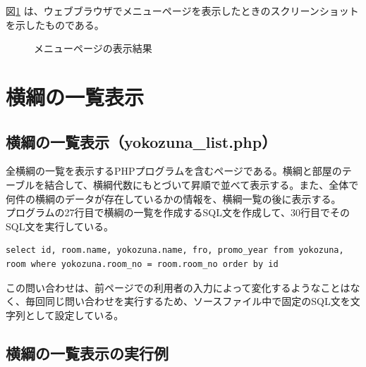\documentclass[10pt,a4paper,titlepage]{jreport}
\begin{document}
図\ref{fig:menu} は、ウェブブラウザでメニューページを表示したときのスクリーンショットを示したものである。

\begin{figure}[h]
	\begin{center}
	\end{center}
	\caption{メニューページの表示結果
	}
	\label{fig:menu}
\end{figure}


\section{横綱の一覧表示}

\subsection{横綱の一覧表示（yokozuna\_list.php）}

全横綱の一覧を表示するPHPプログラムを含むページである。横綱と部屋のテーブルを結合して、横綱代数にもとづいて昇順で並べて表示する。また、全体で何件の横綱のデータが存在しているかの情報を、横綱一覧の後に表示する。\\

プログラムの27行目で横綱の一覧を作成するSQL文を作成して、30行目でそのSQL文を実行している。\\

\begin{lstlisting}[caption=横綱の一覧表示のためのSQL]
select id, room.name, yokozuna.name, fro, promo_year from yokozuna, room where yokozuna.room_no = room.room_no order by id
\end{lstlisting}

この問い合わせは、前ページでの利用者の入力によって変化するようなことはなく、毎回同じ問い合わせを実行するため、ソースファイル中で固定のSQL文を文字列として設定している。




\subsection{横綱の一覧表示の実行例}
\end{document}
